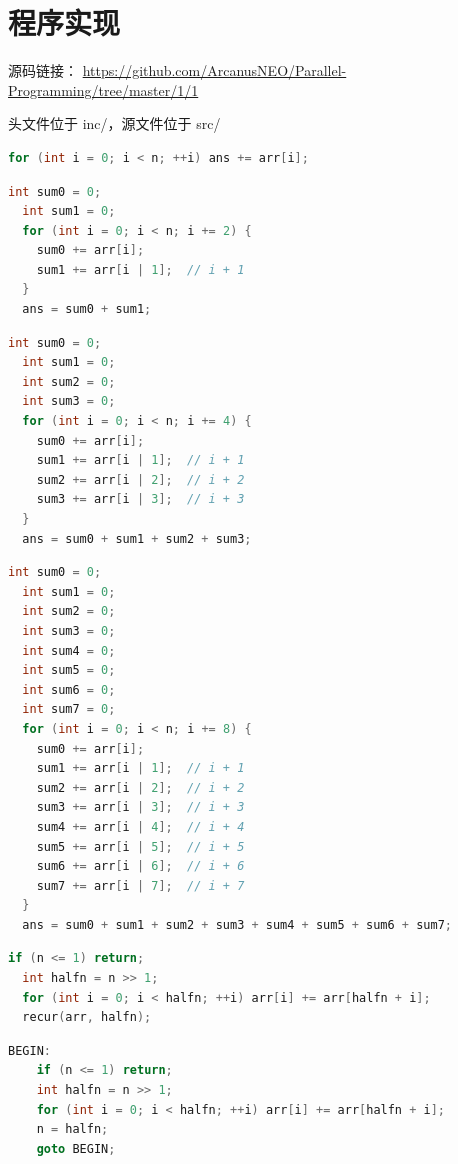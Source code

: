 \documentclass[a4paper]{article}
\begin{document}
\section{程序实现}
源码链接：
\url{https://github.com/ArcanusNEO/Parallel-Programming/tree/master/1/1}

头文件位于 inc/，源文件位于 src/

\begin{lstlisting}[title=链式算法,frame=trbl,language={C++}]
  for (int i = 0; i < n; ++i) ans += arr[i];
\end{lstlisting}

\begin{lstlisting}[title=2 路链式算法,frame=trbl,language={C++}]
  int sum0 = 0;
  int sum1 = 0;
  for (int i = 0; i < n; i += 2) {
    sum0 += arr[i];
    sum1 += arr[i | 1];  // i + 1
  }
  ans = sum0 + sum1;
\end{lstlisting}

\begin{lstlisting}[title=4 路链式算法,frame=trbl,language={C++}]
  int sum0 = 0;
  int sum1 = 0;
  int sum2 = 0;
  int sum3 = 0;
  for (int i = 0; i < n; i += 4) {
    sum0 += arr[i];
    sum1 += arr[i | 1];  // i + 1
    sum2 += arr[i | 2];  // i + 2
    sum3 += arr[i | 3];  // i + 3
  }
  ans = sum0 + sum1 + sum2 + sum3;
\end{lstlisting}

\begin{lstlisting}[title=8 路链式算法,frame=trbl,language={C++}]
  int sum0 = 0;
  int sum1 = 0;
  int sum2 = 0;
  int sum3 = 0;
  int sum4 = 0;
  int sum5 = 0;
  int sum6 = 0;
  int sum7 = 0;
  for (int i = 0; i < n; i += 8) {
    sum0 += arr[i];
    sum1 += arr[i | 1];  // i + 1
    sum2 += arr[i | 2];  // i + 2
    sum3 += arr[i | 3];  // i + 3
    sum4 += arr[i | 4];  // i + 4
    sum5 += arr[i | 5];  // i + 5
    sum6 += arr[i | 6];  // i + 6
    sum7 += arr[i | 7];  // i + 7
  }
  ans = sum0 + sum1 + sum2 + sum3 + sum4 + sum5 + sum6 + sum7;
\end{lstlisting}

\begin{lstlisting}[title=递归算法,frame=trbl,language={C++}]
  if (n <= 1) return;
  int halfn = n >> 1;
  for (int i = 0; i < halfn; ++i) arr[i] += arr[halfn + i];
  recur(arr, halfn);
\end{lstlisting}

\begin{lstlisting}[title=手动消去尾递归算法,frame=trbl,language={C++}]
  BEGIN:
    if (n <= 1) return;
    int halfn = n >> 1;
    for (int i = 0; i < halfn; ++i) arr[i] += arr[halfn + i];
    n = halfn;
    goto BEGIN;
\end{lstlisting}
\end{document}
